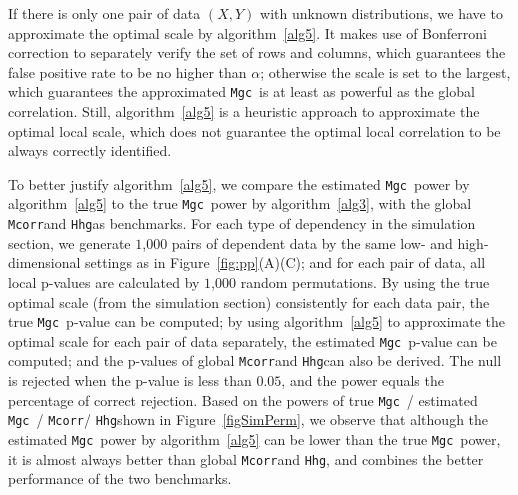 \documentclass[11pt]{article}
\providecommand{\sct}[1]{{\sc \texttt{#1}}}
\newcommand{\Mgc}{\sct{Mgc}}
\newcommand{\Hhg}{\sct{Hhg}}
\newcommand{\Mcorr}{\sct{Mcorr}}
\begin{document}
If there is only one pair of data $(X,Y)$ with unknown distributions, we have to approximate the optimal scale by algorithm~\ref{alg5}. It makes use of Bonferroni correction to separately verify the set of rows and columns, which guarantees the false positive rate to be no higher than $\alpha$; otherwise the scale is set to the largest, which guarantees the approximated \Mgc~is at least as powerful as the global correlation. Still, algorithm~\ref{alg5} is a heuristic approach to approximate the optimal local scale, which does not guarantee the optimal local correlation to be always correctly identified.


To better justify algorithm~\ref{alg5}, we compare the estimated \Mgc~power by algorithm~\ref{alg5} to the true \Mgc~power by algorithm~\ref{alg3}, with the global \Mcorr and \Hhg as benchmarks. For each type of dependency in the simulation section, we generate $1$,$000$ pairs of dependent data by the same low- and high-dimensional settings as in Figure~\ref{fig:pp}(A)(C); and for each pair of data, all local p-values are calculated by $1$,$000$ random permutations. By using the true optimal scale (from the simulation section) consistently for each data pair, the true \Mgc~p-value can be computed; by using algorithm~\ref{alg5} to approximate the optimal scale for each pair of data separately, the estimated \Mgc~p-value can be computed; and the p-values of global \Mcorr and \Hhg can also be derived. The null is rejected when the p-value is less than $0.05$, and the power equals the percentage of correct rejection. Based on the powers of true \Mgc~/ estimated \Mgc~/ \Mcorr / \Hhg shown in Figure~\ref{figSimPerm}, we observe that although the estimated \Mgc~power by algorithm~\ref{alg5} can be lower than the true \Mgc~power, it is almost always better than global \Mcorr and \Hhg, and combines the better performance of the two benchmarks. 
\end{document}
